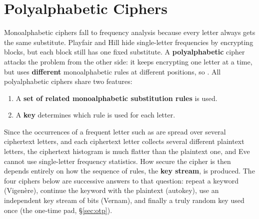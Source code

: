 \section{Polyalphabetic Ciphers}\label{sec:poly}

Monoalphabetic ciphers fall to frequency analysis because every letter always gets the same substitute. Playfair and Hill hide single-letter frequencies by encrypting blocks, but each block still has one fixed substitute. A \textbf{polyalphabetic} cipher attacks the problem from the other side: it keeps encrypting one letter at a time, but uses \textbf{different} monoalphabetic rules at different positions, so . All polyalphabetic ciphers share two features:
\begin{enumerate}[leftmargin=1.5em]
  \item A \textbf{set of related monoalphabetic substitution rules} is used.
  \item A \textbf{key} determines which rule is used for each letter.
\end{enumerate}
Since the occurrences of a frequent letter such as  are spread over several ciphertext letters, and each ciphertext letter collects several different plaintext letters, the ciphertext histogram is much flatter than the plaintext one, and Eve cannot use single-letter frequency statistics. How secure the cipher is then depends entirely on how the sequence of rules, the \textbf{key stream}, is produced. The four ciphers below are successive answers to that question: repeat a keyword (Vigen\`ere), continue the keyword with the plaintext (autokey), use an independent key stream of bits (Vernam), and finally a truly random key used once (the one-time pad, \S\ref{sec:otp}).

